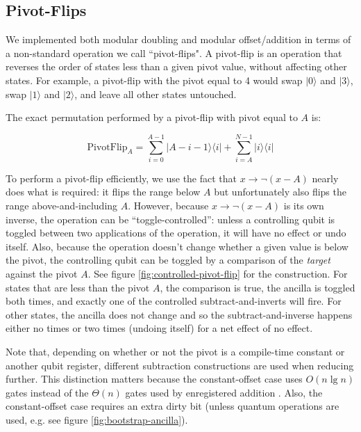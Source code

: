 \documentclass[twocolumn]{article}
\begin{document}
\subsection{Pivot-Flips} \label{sec:pivot-flips}

We implemented both modular doubling and modular offset/addition in terms of a non-standard operation we call ``pivot-flips".
A pivot-flip is an operation that reverses the order of states less than a given pivot value, without affecting other states.
For example, a pivot-flip with the pivot equal to 4 would swap $|0\rangle$ and $|3\rangle$, swap $|1\rangle$ and $|2\rangle$, and leave all other states untouched.

The exact permutation performed by a pivot-flip with pivot equal to $A$ is:

$$\text{PivotFlip}_A = \sum_{i=0}^{A-1} |A-i-1\rangle \langle i| + \sum_{i=A}^{N-1} |i\rangle \langle i|$$

To perform a pivot-flip efficiently, we use the fact that $x \rightarrow \lnot(x - A)$ nearly does what is required: it flips the range below $A$ but unfortunately also flips the range above-and-including $A$.
However, because $x \rightarrow \lnot(x - A)$ is its own inverse, the operation can be ``toggle-controlled'': unless a controlling qubit is toggled between two applications of the operation, it will have no effect or undo itself.
Also, because the operation doesn't change whether a given value is below the pivot, the controlling qubit can be toggled by a comparison of the {\em target} against the pivot $A$.
See figure \ref{fig:controlled-pivot-flip} for the construction.
For states that are less than the pivot $A$, the comparison is true, the ancilla is toggled both times, and exactly one of the controlled subtract-and-inverts will fire.
For other states, the ancilla does not change and so the subtract-and-inverse happens either no times or two times (undoing itself) for a net effect of no effect.

Note that, depending on whether or not the pivot is a compile-time constant or another qubit register, different subtraction constructions are used when reducing further.
This distinction matters because the constant-offset case uses $O(n \lg n)$ gates \cite{haner2016} instead of the $\Theta(n)$ gates used by enregistered addition \cite{takahashi2005}.
Also, the constant-offset case requires an extra dirty bit (unless quantum operations are used, e.g. see figure \ref{fig:bootstrap-ancilla}).
\end{document}
